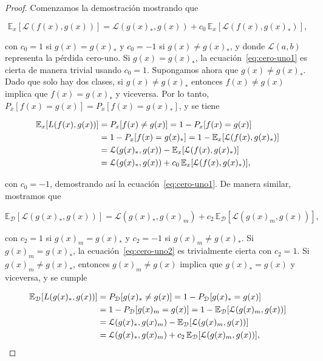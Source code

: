 \begin{proof}
    Comenzamos la demostración mostrando que

    \begin{equation}\label{eq:cero-uno1}
        \mathbb{E}_{x}[\mathcal{L}(f(x), g(x))] = \mathcal{L}(g(x)_*, g(x)) + c_0 \, \mathbb{E}_{x}[\mathcal{L}(f(x), g(x)_*)],
    \end{equation}

    con $c_0 = 1$ si $g(x) = g(x)_*$ y $c_0 = -1$ si $g(x) \neq g(x)_*$, y donde $\mathcal{L}(a, b)$ representa la pérdida cero-uno. Si $g(x) = g(x)_*$, la ecuación~\eqref{eq:cero-uno1} es cierta de manera trivial usando $c_0 = 1$. Supongamos ahora que $g(x) \neq g(x)_*$. Dado que solo hay dos clases, si $g(x) \neq g(x)_*$ entonces $f(x) \neq g(x)$ implica que $f(x) = g(x)_*$ y viceversa. Por lo tanto, $P_{x}[f(x) = g(x)] = P_{x}[f(x) = g(x)_*]$, y se tiene

    \begin{align}
        \mathbb{E}_x[L(f(x), g(x))] 
        &= P_{x}[f(x) \neq g(x)] \notag = 1 - P_{x}[f(x) = g(x)] \notag \\
        &= 1 - P_{x}[f(x) = g(x)_*] \notag = 1 - \mathbb{E}_{x}[\mathcal{L}(f(x), g(x)_*)] \notag \\
        &= \mathcal{L}(g(x)_*, g(x)) - \mathbb{E}_{x}[\mathcal{L}(f(x), g(x)_*)] \notag \\
        &= \mathcal{L}(g(x)_*, g(x)) + c_0 \, \mathbb{E}_{x}[\mathcal{L}(f(x), g(x)_*)],
    \end{align}        

    con $c_0 = -1$, demostrando así la ecuación~\eqref{eq:cero-uno1}. De manera similar, mostramos que

    \begin{equation}\label{eq:cero-uno2}
        \mathbb{E}_\mathcal{D}[\mathcal{L}(g(x)_*, g(x))] = \mathcal{L}(g(x)_*, g(x)_m) + c_2 \, \mathbb{E}_\mathcal{D}[\mathcal{L}(g(x)_m, g(x))],
    \end{equation}

    con $c_2 = 1$ si $g(x)_m = g(x)_*$ y $c_2 = -1$ si $g(x)_m \neq g(x)_*$. Si $g(x)_m = g(x)_*$, la ecuación~\eqref{eq:cero-uno2} es trivialmente cierta con $c_2 = 1$. Si $g(x)_m \neq g(x)_*$, entonces $g(x)_m \neq g(x)$ implica que $g(x)_* = g(x)$ y viceversa, y se cumple

    \begin{align}
        \mathbb{E}_\mathcal{D}[L(g(x)_*, g(x))]
        &= P_\mathcal{D}[g(x)_* \neq g(x)] = 1 - P_\mathcal{D}[g(x)_* = g(x)] \notag \\
        &= 1 - P_\mathcal{D}[g(x)_m = g(x)] = 1 - \mathbb{E}_\mathcal{D}[\mathcal{L}(g(x)_m, g(x))] \notag \\
        &= \mathcal{L}(g(x)_*, g(x)_m) - \mathbb{E}_\mathcal{D}[\mathcal{L}(g(x)_m, g(x))] \notag \\
        &= \mathcal{L}(g(x)_*, g(x)_m) + c_2 \, \mathbb{E}_\mathcal{D}[\mathcal{L}(g(x)_m, g(x))],
    \end{align}  


\end{proof}
